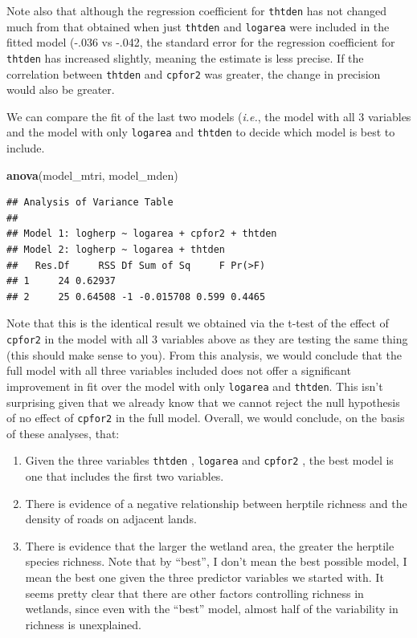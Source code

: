 \documentclass[
  12pt,
]{book}
\newenvironment{Shaded}{\begin{snugshade}}{\end{snugshade}}
\newcommand{\KeywordTok}[1]{\textcolor[rgb]{0.13,0.29,0.53}{\textbf{#1}}}
\newcommand{\NormalTok}[1]{#1}
\providecommand{\tightlist}{%
  \setlength{\itemsep}{0pt}\setlength{\parskip}{0pt}}
\begin{document}
Note also that although the regression coefficient for \texttt{thtden} has not changed much from that obtained when just \texttt{thtden} and \texttt{logarea} were included in the fitted model (-.036 vs -.042, the standard error for the regression coefficient for \texttt{thtden} has increased slightly, meaning the estimate is less precise. If the correlation between \texttt{thtden} and \texttt{cpfor2} was greater, the change in precision would also be greater.

We can compare the fit of the last two models (\emph{i.e.}, the model with all 3 variables and the model with only \texttt{logarea} and \texttt{thtden} to decide which model is best to include.

\begin{Shaded}
\begin{Highlighting}[]
\KeywordTok{anova}\NormalTok{(model\_mtri, model\_mden)}
\end{Highlighting}
\end{Shaded}

\begin{verbatim}
## Analysis of Variance Table
## 
## Model 1: logherp ~ logarea + cpfor2 + thtden
## Model 2: logherp ~ logarea + thtden
##   Res.Df     RSS Df Sum of Sq     F Pr(>F)
## 1     24 0.62937                          
## 2     25 0.64508 -1 -0.015708 0.599 0.4465
\end{verbatim}

Note that this is the identical result we obtained via the t-test of the effect
of \texttt{cpfor2} in the model with all 3 variables above as they are testing the same thing (this should make sense to you). From this analysis, we would conclude that the full model with all three variables included does not offer a significant improvement in fit over the model with only \texttt{logarea} and \texttt{thtden}. This isn't surprising given that we already know that we cannot reject the null hypothesis of no effect of \texttt{cpfor2} in the full model. Overall, we would conclude, on the basis of these analyses, that:

\begin{enumerate}
\def\labelenumi{\arabic{enumi}.}
\tightlist
\item
  Given the three variables \texttt{thtden} , \texttt{logarea} and \texttt{cpfor2} , the best model is one that includes the first two variables.
\item
  There is evidence of a negative relationship between herptile richness and the density of roads on adjacent lands.
\item
  There is evidence that the larger the wetland area, the greater the herptile species richness. Note that by ``best'', I don't mean the best possible model, I mean the best one given the three predictor variables we started with. It seems pretty clear that there are other factors controlling richness in wetlands, since even with the ``best'' model, almost half of the variability in richness is unexplained.
\end{enumerate}
\end{document}
